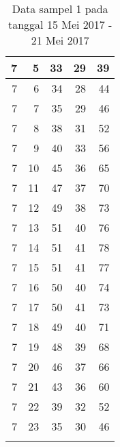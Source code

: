 \begin{longtable}{|r|r|r|r|r|}
    7     & 5     & 33    & 29    & 39 \\\hline
    7     & 6     & 34    & 28    & 44 \\\hline
    7     & 7     & 35    & 29    & 46 \\\hline
    7     & 8     & 38    & 31    & 52 \\\hline
    7     & 9     & 40    & 33    & 56 \\\hline
    7     & 10    & 45    & 36    & 65 \\\hline
    7     & 11    & 47    & 37    & 70 \\\hline
    7     & 12    & 49    & 38    & 73 \\\hline
    7     & 13    & 51    & 40    & 76 \\\hline
    7     & 14    & 51    & 41    & 78 \\\hline
    7     & 15    & 51    & 41    & 77 \\\hline
    7     & 16    & 50    & 40    & 74 \\\hline
    7     & 17    & 50    & 41    & 73 \\\hline
    7     & 18    & 49    & 40    & 71 \\\hline
    7     & 19    & 48    & 39    & 68 \\\hline
    7     & 20    & 46    & 37    & 66 \\\hline
    7     & 21    & 43    & 36    & 60 \\\hline
    7     & 22    & 39    & 32    & 52 \\\hline
    7     & 23    & 35    & 30    & 46 \\\hline
		\caption{Data sampel 1 pada tanggal 15 Mei 2017 - 21 Mei 2017}
  \label{tab:datasample115052017}%
\end{longtable}%

